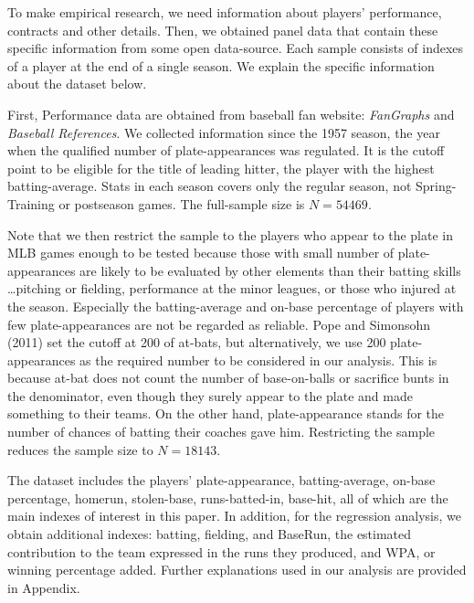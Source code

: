 \documentclass[dvipdfmx, 12pt]{article}
\begin{document}
To make empirical research, we need information about players' performance, contracts and other details. Then, we obtained panel data that contain these specific information from some open data-source. Each sample consists of indexes of a player at the end of a single season. We explain the specific information about the dataset below.

First, Performance data are obtained from baseball fan website:  \textit{FanGraphs} and \textit{Baseball References}. We collected information since the 1957 season, the year when the qualified number of plate-appearances was regulated. It is the cutoff point to be eligible for the title of leading hitter, the player with the highest batting-average. Stats in each season covers only the regular season, not Spring-Training or postseason games. The full-sample size is $N=54469$.

Note that we then restrict the sample to the players who appear to the plate in MLB games enough to be tested because those with small number of plate-appearances are likely to be evaluated by other elements than their batting skills \ldots pitching or fielding, performance at the minor leagues, or those who injured at the season. Especially the batting-average and on-base percentage of players with few plate-appearances are not be regarded as reliable. Pope and Simonsohn (2011) set the cutoff at 200 of at-bats, but alternatively, we use 200 plate-appearances as the required number to be considered in our analysis. This is because at-bat does not count the number of base-on-balls or sacrifice bunts in the denominator, even though they surely appear to the plate and made something to their teams. On the other hand, plate-appearance stands for the number of chances of batting their coaches gave him. Restricting the sample reduces the sample size to $N=18143$.

The dataset includes the players' plate-appearance, batting-average, on-base percentage, homerun, stolen-base, runs-batted-in, base-hit, all of which are the main indexes of interest in this paper. In addition, for the regression analysis, we obtain additional indexes: batting, fielding, and BaseRun, the estimated contribution to the team expressed in the runs they produced, and WPA, or winning percentage added. Further explanations used in our analysis are provided in Appendix.
\end{document}
